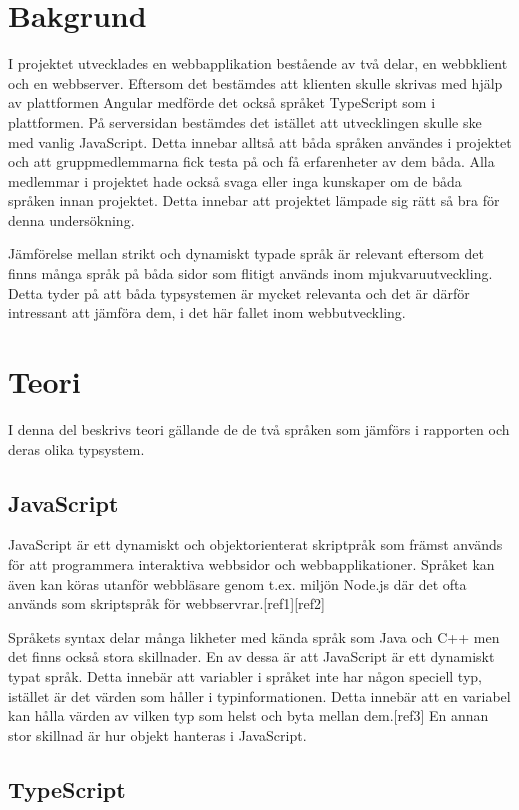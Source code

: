 \section{Bakgrund}
I projektet utvecklades en webbapplikation bestående av två delar, en webbklient och en webbserver. Eftersom det bestämdes att klienten skulle skrivas med hjälp av plattformen Angular medförde det också språket TypeScript som i plattformen. På serversidan bestämdes det istället att utvecklingen skulle ske med vanlig JavaScript. Detta innebar alltså att båda språken användes i projektet och att gruppmedlemmarna fick testa på och få erfarenheter av dem båda. Alla medlemmar i projektet hade också svaga eller inga kunskaper om de båda språken innan projektet. Detta innebar att projektet lämpade sig rätt så bra för denna undersökning.

Jämförelse mellan strikt och dynamiskt typade språk är relevant eftersom det finns många språk på båda sidor som flitigt används inom mjukvaruutveckling. Detta tyder på att båda typsystemen är mycket relevanta och det är därför intressant att jämföra dem, i det här fallet inom webbutveckling.
\section{Teori}
I denna del beskrivs teori gällande de de två språken som jämförs i rapporten och deras olika typsystem.
\subsection{JavaScript}
JavaScript är ett dynamiskt och objektorienterat skriptpråk som främst används för att programmera interaktiva webbsidor och webbapplikationer. Språket kan även kan köras utanför webbläsare genom t.ex. miljön Node.js där det ofta används som skriptspråk för webbservrar.[ref1][ref2]

Språkets syntax delar många likheter med kända språk som Java och C++ men det finns också stora skillnader. En av dessa är att JavaScript är ett dynamiskt typat språk. Detta innebär att variabler i språket inte har någon speciell typ, istället är det värden som håller i typinformationen. Detta innebär att en variabel kan hålla värden av vilken typ som helst och byta mellan dem.[ref3] En annan stor skillnad är hur objekt hanteras i JavaScript. 

\subsection{TypeScript}
